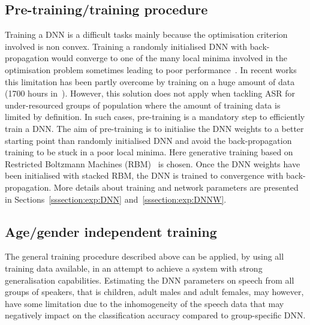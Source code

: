\documentclass{nle}
\begin{document}
\subsection{Pre-training/training procedure}
Training a DNN is a difficult tasks mainly because the optimisation criterion involved is non convex. Training a randomly initialised DNN with back-propagation would converge to one of the many local minima involved in the optimisation problem sometimes leading to poor performance~\citep{erhan10}. In recent works this limitation has been partly overcome by training on a huge amount of data (1700 hours in~\citet{42536}). However, this solution does not apply when tackling ASR for under-resourced groups of population where the amount of training data is limited by definition. In such cases, pre-training is a mandatory step to efficiently train a DNN. The aim of pre-training is to initialise the DNN weights to a better starting point than randomly initialised DNN and avoid the back-propagation training to be stuck in a poor local minima. Here generative training based on Restricted Boltzmann Machines (RBM)~\citep{hinton06,erhan10} is chosen. Once the DNN weights have been initialised with stacked RBM, the DNN is trained to convergence with back-propagation. More details about training and network parameters are presented in Sections~\ref{sssection:exp:DNN} and~\ref{sssection:exp:DNNW}.

\subsection{Age/gender independent training} 
The general training procedure described above can be applied, by using
all training data available, in an attempt to  achieve   a  system  with   strong  generalisation  capabilities.
Estimating the DNN  parameters on speech from all  groups of speakers,
that is  children, adult  males and adult  females, may however, have
some limitation due to the  inhomogeneity of the speech data that may
negatively   impact  on  the   classification  accuracy   compared  to
group-specific DNN.
\end{document}
